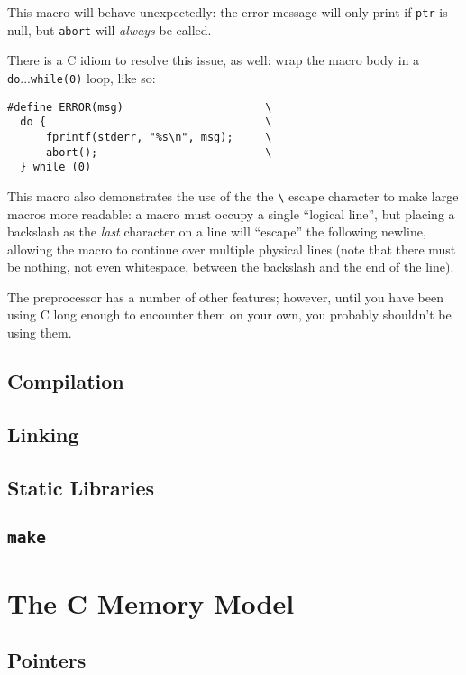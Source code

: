 \documentclass[a4paper,10pt]{article}
\newcommand{\kw}[1]{\texttt{#1}}
\newcommand{\tool}[1]{\texttt{#1}}
\begin{document}
\noindent
This macro will behave unexpectedly: the error message will only print
if \kw{ptr} is null, but \kw{abort} will \emph{always} be called.

There is a C idiom to resolve this issue, as well: wrap the macro body
in a \kw{do}...\kw{while(0)} loop, like so:

\begin{lstlisting}
#define ERROR(msg)                      \
  do {                                  \
      fprintf(stderr, "%s\n", msg);     \
      abort();                          \
  } while (0)
\end{lstlisting}

\noindent
This macro also demonstrates the use of the the \verb!\! escape
character to make large macros more readable: a macro must occupy a
single ``logical line'', but placing a backslash as the \emph{last}
character on a line will ``escape'' the following newline, allowing
the macro to continue over multiple physical lines (note that there
must be nothing, not even whitespace, between the backslash and the
end of the line).


The preprocessor has a number of other features; however, until you
have been using C long enough to encounter them on your own, you
probably shouldn't be using them.

\subsection{Compilation}

\subsection{Linking}

\subsection{Static Libraries}

\subsection{\tool{make}}
\label{sec:make}

\section{The C Memory Model}

\subsection{Pointers}
\end{document}

